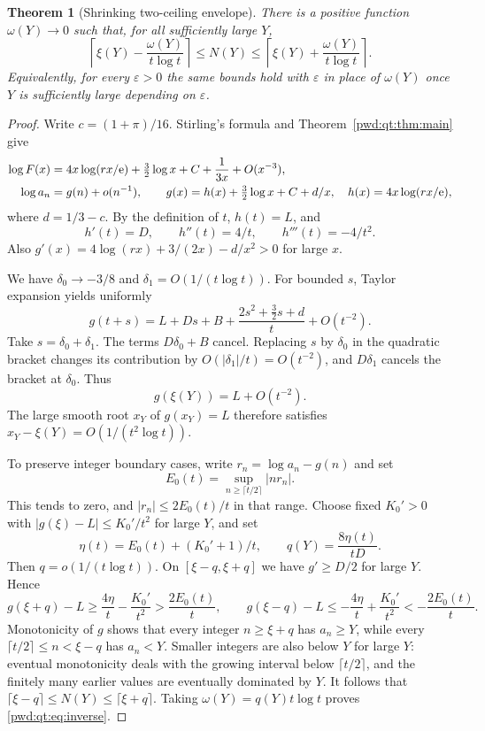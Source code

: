 \documentclass[11pt,letterpaper]{article}
\numberwithin{equation}{section}
\newtheorem{theorem}{Theorem}[section]
\theoremstyle{remark}\newtheorem{remark}[theorem]{Remark}
\begin{document}
\begin{theorem}[Shrinking two-ceiling envelope]\label{pwd:qt:thm:inverse}
There is a positive function $\omega(Y)\to0$ such that, for all sufficiently large $Y$,
\begin{equation}\label{pwd:qt:eq:inverse}
 \left\lceil\xi(Y)-\frac{\omega(Y)}{t\log t}\right\rceil
 \le N(Y)\le
 \left\lceil\xi(Y)+\frac{\omega(Y)}{t\log t}\right\rceil.
\end{equation}
Equivalently, for every $\varepsilon>0$ the same bounds hold with $\varepsilon$ in place of $\omega(Y)$ once $Y$ is sufficiently large depending on $\varepsilon$.
\end{theorem}
\begin{proof}
Write $c=(1+\pi)/16$. Stirling's formula and Theorem~\ref{pwd:qt:thm:main} give
\begin{align}\label{pwd:qt:eq:log-model}
 \log F(x)&=4x\log(rx/\mathrm e)+\tfrac32\log x+C+\frac1{3x}+O(x^{-3}),\notag\\
 \log a_n&=g(n)+o(n^{-1}),\qquad
 g(x)=h(x)+\tfrac32\log x+C+d/x,\quad h(x)=4x\log(rx/\mathrm e),
\end{align}
where $d=1/3-c$. By the definition of $t$, $h(t)=L$, and
\[
 h'(t)=D,\qquad h''(t)=4/t,\qquad h'''(t)=-4/t^2.
\]
Also $g'(x)=4\log(rx)+3/(2x)-d/x^2>0$ for large $x$.

We have $\delta_0\to-3/8$ and $\delta_1=O(1/(t\log t))$. For bounded $s$, Taylor expansion yields uniformly
\[
 g(t+s)=L+Ds+B+\frac{2s^2+\tfrac32s+d}{t}+O(t^{-2}).
\]
Take $s=\delta_0+\delta_1$. The terms $D\delta_0+B$ cancel. Replacing $s$ by $\delta_0$ in the quadratic bracket changes its contribution by $O(|\delta_1|/t)=O(t^{-2})$, and $D\delta_1$ cancels the bracket at $\delta_0$. Thus
\begin{equation}\label{pwd:qt:eq:center-error}
 g(\xi(Y))=L+O(t^{-2}).
\end{equation}
The large smooth root $x_Y$ of $g(x_Y)=L$ therefore satisfies
$x_Y-\xi(Y)=O(1/(t^2\log t))$.

To preserve integer boundary cases, write $r_n=\log a_n-g(n)$ and set
\[
 E_0(t)=\sup_{n\ge\lceil t/2\rceil}|nr_n|.
\]
This tends to zero, and $|r_n|\le2E_0(t)/t$ in that range. Choose fixed $K_0'>0$ with $|g(\xi)-L|\le K_0'/t^2$ for large $Y$, and set
\[
 \eta(t)=E_0(t)+(K_0'+1)/t,\qquad q(Y)=\frac{8\eta(t)}{tD}.
\]
Then $q=o(1/(t\log t))$. On $[\xi-q,\xi+q]$ we have $g'\ge D/2$ for large $Y$. Hence
\[
 g(\xi+q)-L\ge\frac{4\eta}{t}-\frac{K_0'}{t^2}>\frac{2E_0(t)}t,
 \qquad
 g(\xi-q)-L\le-\frac{4\eta}{t}+\frac{K_0'}{t^2}<-\frac{2E_0(t)}t.
\]
Monotonicity of $g$ shows that every integer $n\ge\xi+q$ has $a_n\ge Y$, while every $\lceil t/2\rceil\le n<\xi-q$ has $a_n<Y$. Smaller integers are also below $Y$ for large $Y$: eventual monotonicity deals with the growing interval below $\lceil t/2\rceil$, and the finitely many earlier values are eventually dominated by $Y$. It follows that
$\lceil\xi-q\rceil\le N(Y)\le\lceil\xi+q\rceil$.
Taking $\omega(Y)=q(Y)t\log t$ proves \eqref{pwd:qt:eq:inverse}.
\end{proof}
\end{document}
